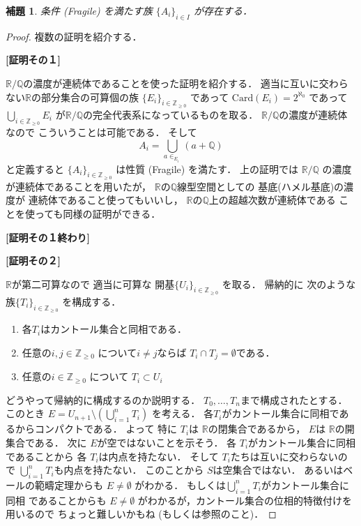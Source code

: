 \documentclass[leqno, a4paper, 12pt]{jsarticle}
\newtheorem{lem}[thm]{補題}
\theoremstyle{definition}
\newcommand{\zz}{\mathbb{Z}}
\newcommand{\qq}{\mathbb{Q}}
\newcommand{\rr}{\mathbb{R}}
\newcommand{\card}{\mathrm{Card}}
\newcommand{\myco}{2^{\aleph_{0}}}
\newcommand{\mysq}{\textup{(Fragile)}}
\begin{document}
\begin{lem}\label{lem:fragile}
条件
\mysq
を満たす族
$\{A_{i}\}_{i\in I}$
が存在する．
\end{lem}
\begin{proof}
複数の証明を紹介する．

\textbf{[証明その１]}

$\rr/\qq$の濃度が連続体であることを使った証明を紹介する．
適当に互いに交わらない$\rr$の部分集合の可算個の族
$\{E_{i}\}_{i\in \zz_{\ge 0}}$
であって
$\card(E_{i})=\myco$
であって
$\bigcup_{i\in \zz_{\ge 0}}E_{i}$
が$\rr/\qq$の完全代表系になっているものを取る．
$\rr/\qq$の濃度が連続体なので
こういうことは可能である．
そして
\[
A_{i}=\bigcup_{a\in _{E_{i}}}(a+\qq)
\]
と定義すると
$\{A_{i}\}_{i\in \zz_{\ge 0}}$
は性質
\mysq
を満たす．
上の証明では
$\rr/\qq$
の濃度が連続体であることを用いたが，
$\rr$の$\qq$線型空間としての
基底(ハメル基底)の濃度が
連続体であること使ってもいいし，
$\rr$の$\qq$上の超越次数が連続体である
ことを使っても同様の証明ができる．

\textbf{[証明その１終わり]}

\textbf{[証明その２]}


$\rr$が第二可算なので
適当に可算な
開基$\{U_{i}\}_{i\in \zz_{\ge 0}}$
を取る．
帰納的に
次のような族$\{T_{i}\}_{i\in \zz_{\ge 0}}$
を構成する．
\begin{enumerate}[label=\textup{(\arabic*)}]
\item 
各$T_{i}$はカントール集合と同相である．
\item 
任意の$i, j\in \zz_{\ge 0}$
について$i\neq j$ならば
$T_{i}\cap T_{j}=\emptyset$である．
\item 
任意の$i\in \zz_{\ge 0}$
について
$T_{i}\subset U_{i}$
\end{enumerate}
どうやって帰納的に構成するのか説明する．
$T_{0}, \dots, T_{n}$まで構成されたとする．
このとき
$E=U_{n+1}\setminus \left(\bigcup_{i=1}^{n}T_{i}\right)$
を考える．
各$T_{i}$がカントール集合に同相であるからコンパクトである．
よって
特に
$T_{i}$は
$\rr$の閉集合であるから，
$E$は
$\rr$の開集合である．
次に
$E$が空ではないことを示そう．
各
$T_{i}$がカントール集合に同相であることから
各
$T_{i}$は内点を持たない．
そして
$T_{i}$たちは互いに交わらないので
$\bigcup_{i=1}^{n}T_{i}$も内点を持たない．
このことから
$S$は空集合ではない．
あるいはベールの範疇定理からも
$E\neq \emptyset$
がわかる．
もしくは$\bigcup_{i=1}^{n}T_{i}$がカントール集合に同相
であることからも
$E\neq \emptyset$
がわかるが，カントール集合の位相的特徴付けを用いるので
ちょっと難しいかもね
(\cite{Den1}もしくは\cite{wa2}参照のこと)．



\end{proof}
\end{document}
